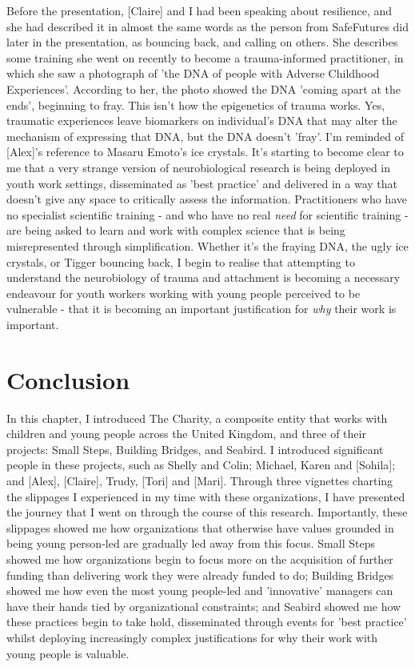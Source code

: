Before the presentation, [Claire] and I had been speaking about resilience, and she had described it in almost the same words as the person from SafeFutures did later in the presentation, as bouncing back, and calling on others. She describes some training she went on recently to become a trauma-informed practitioner, in which she saw a photograph of 'the DNA of people with Adverse Childhood Experiences'. According to her, the photo showed the DNA 'coming apart at the ends', beginning to fray. This isn't how the epigenetics of trauma works. Yes, traumatic experiences leave biomarkers on individual's DNA that may alter the mechanism of expressing that DNA, but the DNA doesn't 'fray'. I'm reminded of [Alex]'s reference to Masaru Emoto's ice crystals. It's starting to become clear to me that a very strange version of neurobiological research is being deployed in youth work settings, disseminated as 'best practice' and delivered in a way that doesn't give any space to critically assess the information. Practitioners who have no specialist scientific training - and who have no real \textit{need} for scientific training - are being asked to learn and work with complex science that is being misrepresented through simplification. Whether it's the fraying DNA, the ugly ice crystals, or Tigger bouncing back, I begin to realise that attempting to understand the neurobiology of trauma and attachment is becoming a necessary endeavour for youth workers working with young people perceived to be vulnerable - that it is becoming an important justification for \textit{why} their work is important.

\section{Conclusion}

In this chapter, I introduced The Charity, a composite entity that works with children and young people across the United Kingdom, and three of their projects: Small Steps, Building Bridges, and Seabird. I introduced significant people in these projects, such as Shelly and Colin; Michael, Karen and [Sohila]; and [Alex], [Claire], Trudy, [Tori] and [Mari]. Through three vignettes charting the slippages I experienced in my time with these organizations, I have presented the journey that I went on through the course of this research. Importantly, these slippages showed me how organizations that otherwise have values grounded in being young person-led are gradually led away from this focus. Small Steps showed me how organizations begin to focus more on the acquisition of further funding than delivering work they were already funded to do; Building Bridges showed me how even the most young people-led and 'innovative' managers can have their hands tied by organizational constraints; and Seabird showed me how these practices begin to take hold, disseminated through events for 'best practice' whilst deploying increasingly complex justifications for why their work with young people is valuable. 